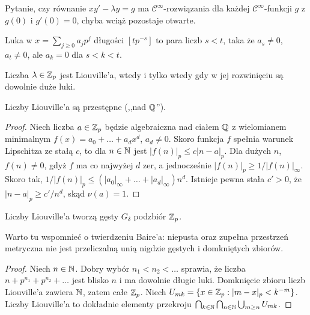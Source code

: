 Pytanie, czy równanie $xy' - \lambda y = g$ ma $\mathcal C^\infty$-rozwiązania dla każdej $\mathcal C^\infty$-funkcji $g$ z $g(0)$ i $g'(0) = 0$, chyba wciąż pozostaje otwarte.

\begin{definicja}
	Luka  w $x = \sum_{j \ge 0} a_jp^j$ długości $[tp^{-s}]$ to para liczb $s < t$, taka że $a_s \neq 0$, $a_t \neq 0$, ale $a_k = 0$ dla $s < k < t$.
\end{definicja}

\begin{fakt}
	Liczba $\lambda \in \mathbb Z_p$ jest Liouville'a, wtedy i tylko wtedy gdy w jej rozwinięciu są dowolnie duże luki.
\end{fakt}

\begin{fakt}
	Liczby Liouville'a są przestępne (,,nad $\mathbb Q$'').
\end{fakt}

\begin{proof}
	Niech liczba $a \in \mathbb Z_p$ będzie algebraiczna nad ciałem $\mathbb Q$ z wielomianem minimalnym $f(x) = a_0 + \ldots + a_d x^d$, $a_d \neq 0$.
	Skoro funkcja $f$ spełnia warunek Lipschitza ze stałą $c$, to dla $n \in \mathbb N$ jest $|f(n)|_p \le c|n-a|_p$.
	Dla dużych $n$, $f(n) \neq 0$, gdyż $f$ ma co najwyżej $d$ zer, a jednocześnie $|f(n)|_p \ge 1/|f(n)|_\infty$.
	Skoro tak, $1/ |f(n)|_p \le (|a_0|_\infty + \ldots + |a_d|_\infty) n^d$.
	Istnieje pewna stała $c' > 0$, że $|n - a|_p \ge c' / n^{d}$, skąd $\nu(a) = 1$.
\end{proof}

\begin{fakt}
	Liczby Liouville'a tworzą gęsty $G_\delta$ podzbiór $\mathbb Z_p$.
\end{fakt}

Warto tu wspomnieć o twierdzeniu Baire'a: niepusta oraz zupełna przestrzeń metryczna nie jest przeliczalną unią nigdzie gęstych i domkniętych zbiorów.

\begin{proof}
	Niech $n \in \mathbb N$.
	Dobry wybór $n_1 < n_2 < \ldots$ sprawia, że liczba $n + p^{n_1} + p^{n_2} + \ldots$ jest blisko $n$ i ma dowolnie długie luki.
	Domknięcie zbioru liczb Liouville'a zawiera $\mathbb N$, zatem całe $\mathbb Z_p$.
	Niech $U_{mk} = \{x \in \mathbb Z_p : |m-x|_p < k^{-m}\}$.
	Liczby Liouville'a to dokładnie elementy przekroju $\bigcap_{k \in \mathbb N} \bigcap_{n \in \mathbb N} \bigcup_{m \ge n} U_{mk}$.
\end{proof}

